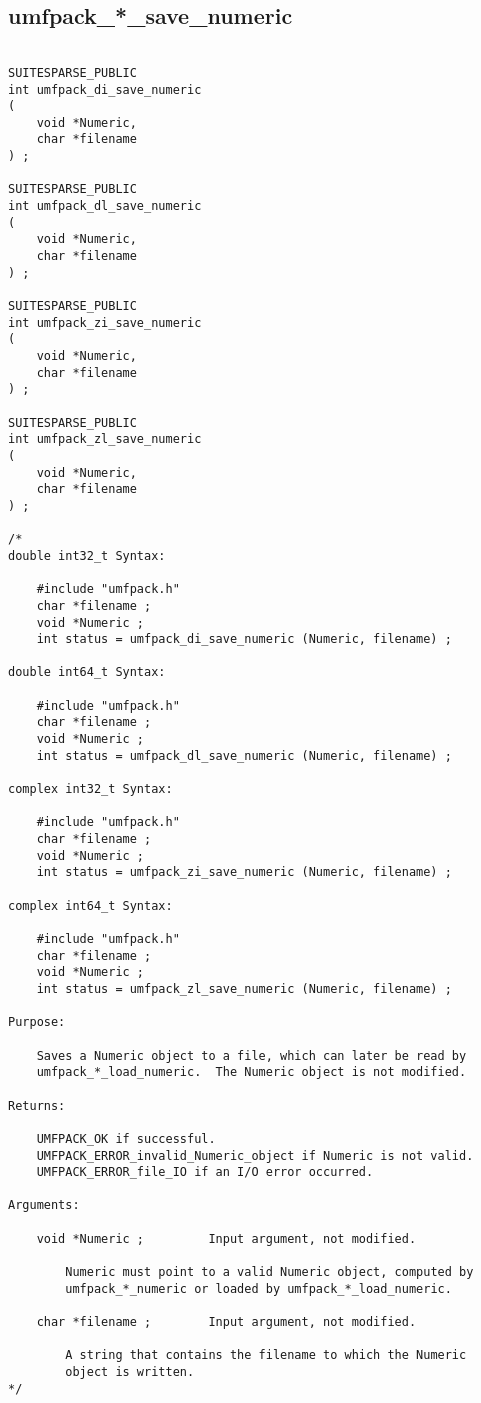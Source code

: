 \documentclass[11pt]{article}
\begin{document}
\newpage
\subsection{umfpack\_*\_save\_numeric}

{\footnotesize
\begin{verbatim}

SUITESPARSE_PUBLIC
int umfpack_di_save_numeric
(
    void *Numeric,
    char *filename
) ;

SUITESPARSE_PUBLIC
int umfpack_dl_save_numeric
(
    void *Numeric,
    char *filename
) ;

SUITESPARSE_PUBLIC
int umfpack_zi_save_numeric
(
    void *Numeric,
    char *filename
) ;

SUITESPARSE_PUBLIC
int umfpack_zl_save_numeric
(
    void *Numeric,
    char *filename
) ;

/*
double int32_t Syntax:

    #include "umfpack.h"
    char *filename ;
    void *Numeric ;
    int status = umfpack_di_save_numeric (Numeric, filename) ;

double int64_t Syntax:

    #include "umfpack.h"
    char *filename ;
    void *Numeric ;
    int status = umfpack_dl_save_numeric (Numeric, filename) ;

complex int32_t Syntax:

    #include "umfpack.h"
    char *filename ;
    void *Numeric ;
    int status = umfpack_zi_save_numeric (Numeric, filename) ;

complex int64_t Syntax:

    #include "umfpack.h"
    char *filename ;
    void *Numeric ;
    int status = umfpack_zl_save_numeric (Numeric, filename) ;

Purpose:

    Saves a Numeric object to a file, which can later be read by
    umfpack_*_load_numeric.  The Numeric object is not modified.

Returns:

    UMFPACK_OK if successful.
    UMFPACK_ERROR_invalid_Numeric_object if Numeric is not valid.
    UMFPACK_ERROR_file_IO if an I/O error occurred.

Arguments:

    void *Numeric ;         Input argument, not modified.

        Numeric must point to a valid Numeric object, computed by
        umfpack_*_numeric or loaded by umfpack_*_load_numeric.

    char *filename ;        Input argument, not modified.

        A string that contains the filename to which the Numeric
        object is written.
*/
\end{verbatim}
}
\end{document}
